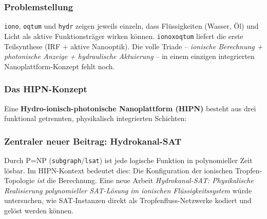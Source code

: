 ﻿\documentclass[a4paper,12pt]{scrreprt}
\theoremstyle{definition}
\begin{document}
\subsubsection{Problemstellung}

\texttt{iono}, \texttt{oqtum} und \texttt{hydr} zeigen jeweils einzeln,
dass Flüssigkeiten (Wasser, Öl) und Licht als aktive Funktionsträger
wirken können. \texttt{ionoxoqtum} liefert die erste Teilsynthese
(IRF + aktive Nanooptik). Die volle Triade -- \emph{ionische Berechnung +
photonische Anzeige + hydraulische Aktuierung} -- in einem einzigen
integrierten Nanoplattform-Konzept fehlt noch.

\subsubsection{Das HIPN-Konzept}

Eine \textbf{Hydro-ionisch-photonische Nanoplattform (HIPN)} besteht aus
drei funktional getrennten, physikalisch integrierten Schichten:

\begin{center}
\end{center}

\subsubsection{Zentraler neuer Beitrag: Hydrokanal-SAT}

Durch P=NP (\texttt{subgraph}/\texttt{lsat}) ist jede logische Funktion
in polynomieller Zeit lösbar. Im HIPN-Kontext bedeutet dies: Die Konfiguration
der ionischen Tropfen-Topologie \emph{ist} die Berechnung. Eine neue Arbeit
\emph{Hydrokanal-SAT: Physikalische Realisierung polynomieller SAT-Lösung
im ionischen Flüssigkeitssystem} würde untersuchen, wie SAT-Instanzen
direkt als Tropfenfluss-Netzwerke kodiert und gelöst werden können.
\end{document}
